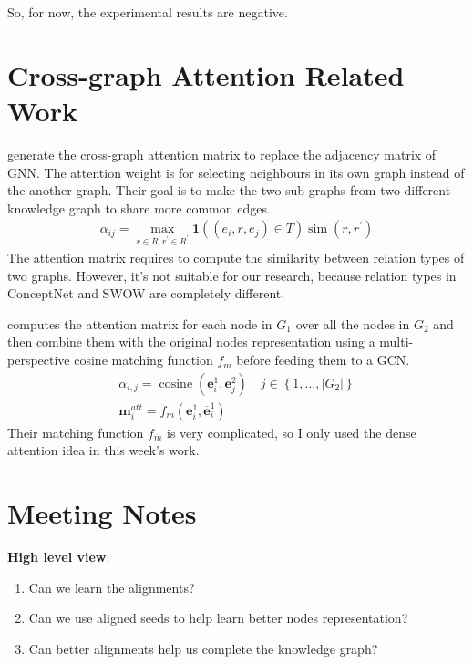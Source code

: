 So, for now, the experimental results are negative. 
\newpage
\section{Cross-graph Attention Related Work}

\cite{cao-etal-2019-multi} generate the cross-graph attention matrix to replace the adjacency matrix of GNN. The attention weight is for selecting neighbours in its own graph instead of the another graph. Their goal is to make the two sub-graphs from two different knowledge graph to share more common edges. 
\begin{align}
    \alpha_{i j}=\max _{r \in R, r^{\prime} \in R^{\prime}} \mathbf{1}\left(\left(e_{i}, r, e_{j}\right) \in T\right) \operatorname{sim}\left(r, r^{\prime}\right)
\end{align}
The attention matrix requires to compute the similarity between relation types of two graphs. However, it's not suitable for our research, because relation types in ConceptNet and SWOW are completely different. 

\cite{xu-etal-2019-cross-lingual} computes the attention matrix for each node in $G_{1}$ over all the nodes in $G_{2}$ and then combine them with the original nodes representation using a  multi-perspective cosine matching function $f_m$ before feeding them to a GCN. 
\begin{align}
    \alpha_{i, j}=\operatorname{cosine}\left(\boldsymbol{e}_{i}^{1}, \boldsymbol{e}_{j}^{2}\right) \quad j \in\left\{1, \ldots,\left|G_{2}\right|\right\} \\
    \boldsymbol{m}_{i}^{a t t}=f_{m}\left(\boldsymbol{e}_{i}^{1}, \overline{\boldsymbol{e}}_{i}^{1}\right)
\end{align}
Their matching function $f_m$ is very complicated, so I only used the dense attention idea in this week's work. 

\section{Meeting Notes}

\textbf{High level view}: 
\begin{enumerate}
    \item Can we learn the alignments?
    \item Can we use aligned seeds to help learn better nodes representation?
    \item Can better alignments help us complete the knowledge graph? 
\end{enumerate}


